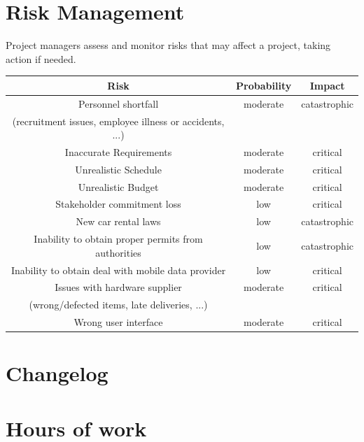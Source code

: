 \documentclass[english]{article}
\begin{document}
\section{Risk Management}
Project managers assess and monitor risks that may affect a project, taking action if needed.   
\begin{center}
	\begin{tabular}{|c|c|c|}
		\hline
		\textbf{Risk} & \textbf{Probability } &  \textbf{Impact} \\
		\hline
		Personnel shortfall & moderate & catastrophic\\(recruitment issues, employee illness or accidents, ...) & & \\
		\hline
		Inaccurate Requirements & moderate & critical\\
		\hline
		Unrealistic Schedule & moderate & critical\\
		\hline
		Unrealistic Budget & moderate & critical\\
		\hline
		Stakeholder commitment loss & low & critical\\
		\hline
		New car rental laws & low & catastrophic \\
		\hline
		Inability to obtain proper permits from authorities  & low & catastrophic \\
		\hline
		Inability to obtain deal with mobile data provider  & low & critical \\
		\hline		
		Issues with hardware supplier & moderate & critical \\
		(wrong/defected items, late deliveries, ...) & & \\
		\hline
		Wrong user interface & moderate & critical\\
		\hline
	\end{tabular}
\end{center}


\appendix

\section{Changelog}

\section{Hours of work}
\end{document}
